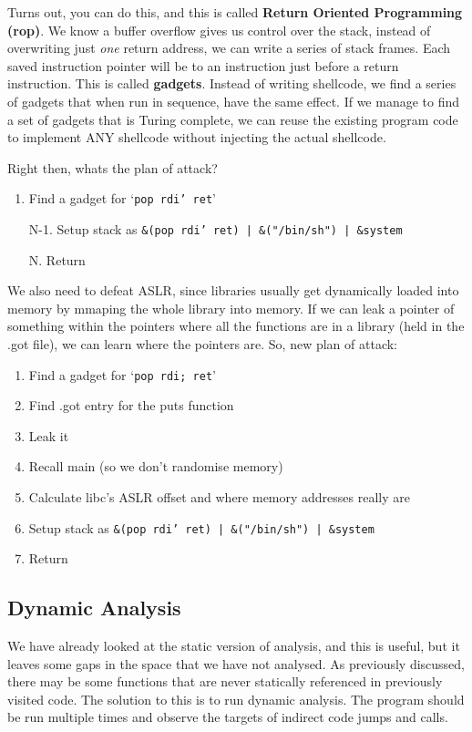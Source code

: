 \documentclass[11pt,a4paper,titlepage,dvipsnames,cmyk]{scrartcl}
\begin{document}
Turns out, you can do this, and this is called \textbf{Return Oriented Programming (rop)}. We know a buffer overflow gives us control over the stack, instead of overwriting just \textit{one} return address, we can write a series of stack frames. Each saved instruction pointer will be to an instruction just before a return instruction. This is called \textbf{gadgets}. Instead of writing shellcode, we find a series of gadgets that when run in sequence, have the same effect. If we manage to find a set of gadgets that is Turing complete, we can reuse the existing program code to implement ANY shellcode without injecting the actual shellcode.

\newpage
Right then, whats the plan of attack?
\begin{enumerate}
\item Find a gadget for `\texttt{pop rdi' ret}'
\item[N-1.] Setup stack as \texttt{\&(pop rdi' ret) | \&("/bin/sh") | \&system}
\item[N.] Return
\end{enumerate}

We also need to defeat ASLR, since libraries usually get dynamically loaded into memory by mmaping the whole library into memory. If we can leak a pointer of something within the pointers where all the functions are in a library (held in the .got file), we can learn where the pointers are. So, new plan of attack:
\begin{enumerate}
\item Find a gadget for `\texttt{pop rdi; ret}'
\item Find .got entry for the puts function
\item Leak it
\item Recall main (so we don't randomise memory)
\item Calculate libc's ASLR offset and where memory addresses really are
\item Setup stack as \texttt{\&(pop rdi' ret) | \&("/bin/sh") | \&system}
\item Return
\end{enumerate}

\subsection{Dynamic Analysis}
We have already looked at the static version of analysis, and this is useful, but it leaves some gaps in the space that we have not analysed. As previously discussed, there may be some functions that are never statically referenced in previously visited code. The solution to this is to run dynamic analysis. The program should be run multiple times and observe the targets of indirect code jumps and calls.
\end{document}
